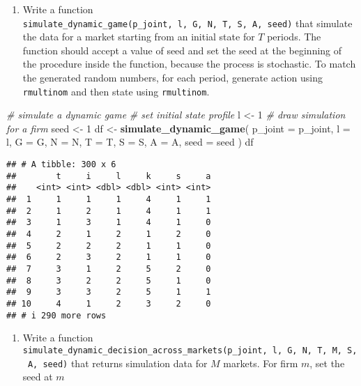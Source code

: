 \documentclass[
]{book}
\newenvironment{Shaded}{\begin{snugshade}}{\end{snugshade}}
\newcommand{\AttributeTok}[1]{\textcolor[rgb]{0.13,0.29,0.53}{#1}}
\newcommand{\CommentTok}[1]{\textcolor[rgb]{0.56,0.35,0.01}{\textit{#1}}}
\newcommand{\DecValTok}[1]{\textcolor[rgb]{0.00,0.00,0.81}{#1}}
\newcommand{\FunctionTok}[1]{\textcolor[rgb]{0.13,0.29,0.53}{\textbf{#1}}}
\newcommand{\NormalTok}[1]{#1}
\newcommand{\OtherTok}[1]{\textcolor[rgb]{0.56,0.35,0.01}{#1}}
\providecommand{\tightlist}{%
  \setlength{\itemsep}{0pt}\setlength{\parskip}{0pt}}
\begin{document}
\begin{enumerate}
\def\labelenumi{\arabic{enumi}.}
\setcounter{enumi}{11}
\tightlist
\item
  Write a function \texttt{simulate\_dynamic\_game(p\_joint,\ l,\ G,\ N,\ T,\ S,\ A,\ seed)} that simulate the data for a market starting from an initial state for \(T\) periods. The function should accept a value of seed and set the seed at the beginning of the procedure inside the function, because the process is stochastic. To match the generated random numbers, for each period, generate action using \texttt{rmultinom} and then state using \texttt{rmultinom}.
\end{enumerate}

\begin{Shaded}
\begin{Highlighting}[]
\CommentTok{\# simulate a dynamic game}
\CommentTok{\# set initial state profile}
\NormalTok{l }\OtherTok{\textless{}{-}} \DecValTok{1}
\CommentTok{\# draw simulation for a firm}
\NormalTok{seed }\OtherTok{\textless{}{-}} \DecValTok{1}
\NormalTok{df }\OtherTok{\textless{}{-}} 
  \FunctionTok{simulate\_dynamic\_game}\NormalTok{(}
    \AttributeTok{p\_joint =}\NormalTok{ p\_joint,}
    \AttributeTok{l =}\NormalTok{ l,}
    \AttributeTok{G =}\NormalTok{ G,}
    \AttributeTok{N =}\NormalTok{ N,}
    \AttributeTok{T =}\NormalTok{ T,}
    \AttributeTok{S =}\NormalTok{ S, }
    \AttributeTok{A =}\NormalTok{ A,}
    \AttributeTok{seed =}\NormalTok{ seed}
\NormalTok{    )}
\NormalTok{df}
\end{Highlighting}
\end{Shaded}

\begin{verbatim}
## # A tibble: 300 x 6
##        t     i     l     k     s     a
##    <int> <int> <dbl> <dbl> <int> <int>
##  1     1     1     1     4     1     1
##  2     1     2     1     4     1     1
##  3     1     3     1     4     1     0
##  4     2     1     2     1     2     0
##  5     2     2     2     1     1     0
##  6     2     3     2     1     1     0
##  7     3     1     2     5     2     0
##  8     3     2     2     5     1     0
##  9     3     3     2     5     1     1
## 10     4     1     2     3     2     0
## # i 290 more rows
\end{verbatim}

\begin{enumerate}
\def\labelenumi{\arabic{enumi}.}
\setcounter{enumi}{12}
\tightlist
\item
  Write a function \texttt{simulate\_dynamic\_decision\_across\_markets(p\_joint,\ l,\ G,\ N,\ T,\ M,\ S,\ A,\ seed)} that returns simulation data for \(M\) markets. For firm \(m\), set the seed at \(m\)
\end{enumerate}
\end{document}
